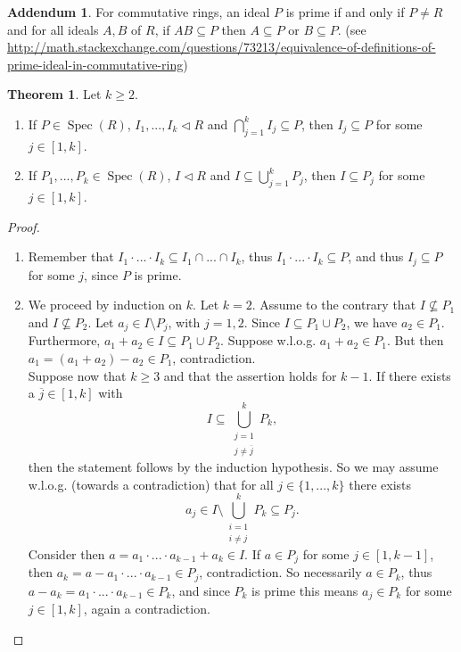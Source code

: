 \documentclass[12pt,a4paper]{report}
\theoremstyle{definition}
\newtheorem{theorem}{Theorem}[chapter] %
\newtheorem*{addendum}{Addendum}
\theoremstyle{num.custom-title}
\DeclareMathOperator{\sm}{\setminus}
\DeclareMathOperator{\sse}{\subseteq}
\DeclareMathOperator{\Spec}{Spec}
\newcommand{\ol}{\overline}
\begin{document}
\begin{addendum}
For commutative rings, an ideal $P$ is prime if and only if $P\neq R$ and for all ideals $A,B$ of $R$, if $AB\subseteq P$ then $A \sse P$ or $B \sse P$. (see \url{http://math.stackexchange.com/questions/73213/equivalence-of-definitions-of-prime-ideal-in-commutative-ring})
\end{addendum}

\begin{theorem}
Let $k \geq 2$.
\begin{enumerate}
\item If $P \in \Spec(R)$, $I_1,...,I_k \lhd R$ and $\bigcap_{j=1}^k I_j \sse P$, then $I_j \sse P$ for some $j \in [1,k]$.
\item If $P_1,...,P_k \in \Spec(R)$, $I \lhd R$ and $I \sse \bigcup_{j=1}^k P_j$, then $I \sse P_j$ for some $j \in [1,k]$.
\end{enumerate}
\begin{proof}\ 
\begin{enumerate}
\item Remember that $I_1 \cdot ... \cdot I_k \sse I_1 \cap ... \cap I_k$, thus $I_1 \cdot ... \cdot I_k \sse P$, and thus $I_j \sse P$ for some $j$, since $P$ is prime.
\item We proceed by induction on $k$. Let $k=2$. Assume to the contrary that $I \nsubseteq P_1$ and $I \nsubseteq P_2$. Let $a_j \in I \sm P_j$, with $j=1,2$. Since $I \sse P_1 \cup P_2$, we have $a_2 \in P_1$. Furthermore, $a_1+a_2 \in I \sse P_1 \cup P_2$. Suppose w.l.o.g. $a_1+a_2 \in P_1$. But then $a_1=(a_1+a_2)-a_2 \in P_1$, contradiction.\\
Suppose now that $k \geq 3$ and that the assertion holds for $k-1$. If there exists a $\ol{j} \in [1,k]$ with 
\[
I \sse \bigcup_{\substack{j=1\\ j \neq \ol{j}}}^k P_k,
\]
then the statement follows by the induction hypothesis. So we may assume w.l.o.g. (towards a contradiction) that for all $j \in \{1,...,k\}$ there exists 
\[
a_j \in I \sm \bigcup_{\substack{i=1\\ i \neq j}}^k P_k \sse P_j.
\]
Consider then $a=a_1 \cdot ... \cdot a_{k-1} + a_k \in I$. If $a \in P_j$ for some $j \in [1,k-1]$, then $a_k=a-a_1 \cdot ... \cdot a_{k-1} \in P_j$, contradiction. So necessarily $a \in P_k$, thus $a-a_k=a_1 \cdot ... \cdot a_{k-1} \in P_k$, and since $P_k$ is prime this means $a_j \in P_k$ for some $j \in [1,k]$, again a contradiction.
\end{enumerate}
\end{proof}
\end{theorem}
\end{document}
